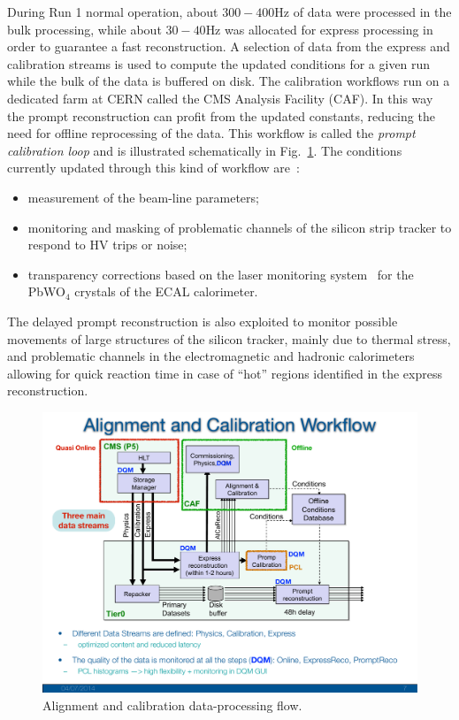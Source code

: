 During Run 1 normal operation, about $300-400$\unit{Hz} of data 
were processed in the bulk processing, while about $30-40$\unit{Hz} was allocated for express
processing in order to guarantee a fast reconstruction. A selection of
data from the express and calibration streams is used
to compute the updated conditions for a given run while the bulk of
the data is buffered on disk. The calibration workflows run on a
dedicated farm at CERN called the CMS Analysis Facility (CAF). In this
way the prompt reconstruction can profit from the updated constants,
reducing the need for offline reprocessing of the data. This workflow
is called the \emph{prompt calibration loop} and is illustrated schematically
in Fig.~\ref{fig:AlCa}. The conditions currently updated through this kind of
workflow are~\cite{Cerminara:1399496,2012AIPC.1504..971E,DeGuio:2121268}:
\begin{itemize}
\item measurement of the beam-line parameters;
\item monitoring and masking of problematic channels of the silicon strip tracker to respond to
HV trips or noise;
\item transparency corrections based on the laser monitoring system~\cite{Anfreville:2007zz,Zhang:2005ip} for the PbWO$_4$ crystals of the ECAL
  calorimeter.
\end{itemize}
The delayed prompt reconstruction is also exploited to
monitor possible movements of large structures of the silicon tracker,
mainly due to thermal stress, and problematic channels in the
electromagnetic and hadronic calorimeters allowing for quick reaction
time in case of ``hot'' regions identified in the express
reconstruction.

\begin{figure}\centering
\includegraphics[width=.9\textwidth,clip=true,viewport=0 180 900 700]{figs/cms/AlCa.pdf}
\caption{Alignment and calibration data-processing flow.\label{fig:AlCa}}
\end{figure}

